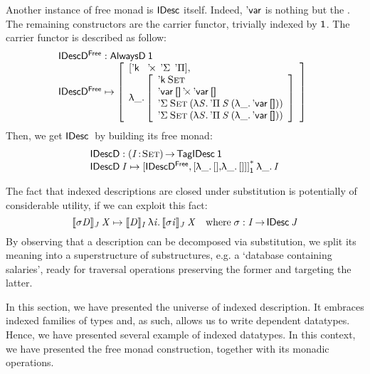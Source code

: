Another instance of free monad is $\SYMBIDesc$ itself. Indeed,
$\SYMBDVar$ is nothing but the \return. The remaining constructors are
the carrier functor, trivially indexed by $\Unit$. The carrier functor
is described as follow:
%
\[\stk{
\IDescFreeD : \ATagIDesc{\Unit} \\
\begin{array}{@{}ll}
\IDescFreeD \mapsto \bigRedBracket{\begin{array}{l}
                                \sqr{\SYMBDConst\:\:
                                     \DProd\:\:
                                     \SYMBDSigma\:\:
                                     \SYMBDPi} \red{,}\\
                                  \LAM{\_}\bigRedBracket{\begin{array}{l}
                                        \DConst{\Set}               \\
                                        \DProd{\DVar{\Void}}{\DVar{\Void}}  \\
                                        \DSigma{\Set}{(\LAM{\V{S}} \DPi{\V{S}}{(\LAM{\_} \DVar{\Void})})} \\
                                        \DSigma{\Set}{(\LAM{\V{S}} \DPi{\V{S}}{(\LAM{\_} \DVar{\Void})})}
                                    \end{array}}\end{array}}
\end{array}
}\]
%
Then, we get $\IDesc$ by building its free monad:
%
\[\stk{
\IDescD : \PI{\V{I}}{\Set} \TagIDesc{\Unit} \\
\IDescD\: \V{I} \mapsto \FreeIMonad{\red{[}\IDescFreeD\red{,[}\LAM{\_}\sqr{}\red{,}\LAM{\_}\red{[]]]}}{\Unit}\LAM{\_}\V{I}
}\]

The fact that indexed descriptions are closed under substitution
is potentially of considerable utility, if we can exploit this fact:
\[
\idescop{\V{\sigma} \V{D}}{\V{J}}{\V{X}} 
    \mapsto 
        \idescop{\V{D}}
                {\V{I}}
                {\LAM{\V{i}}
                     {\idescop{\V{\sigma} \V{i}}
                              {\V{J}}
                              {\V{X}}}}
        \quad \mbox{where}\;\V{\sigma}:\V{I}\To\IDesc{\V{J}}
\]
By observing that a description can be decomposed via substitution, we
split its meaning into a superstructure of substructures, e.g. a
`database containing salaries', ready for traversal operations
preserving the former and targeting the latter.

In this section, we have presented the universe of indexed
description. It embraces indexed families of types and, as such,
allows us to write dependent datatypes. Hence, we have presented
several example of indexed datatypes. In this context, we have
presented the free monad construction, together with its monadic
operations. 
